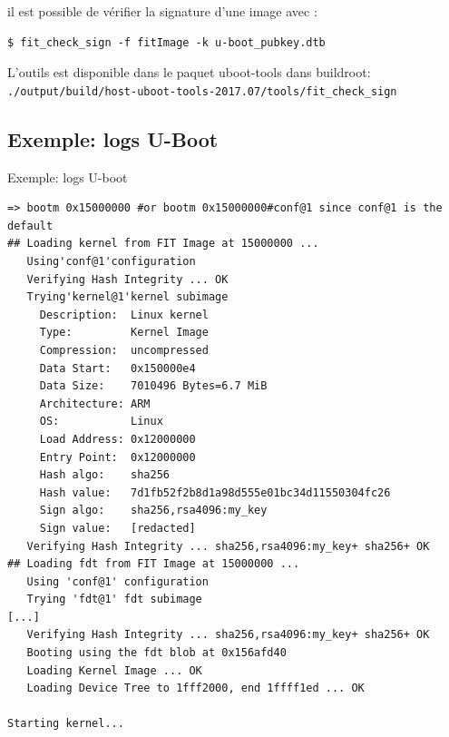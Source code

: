 \documentclass[aspectratio=169]{beamer}
\begin{document}
\begin{frame}[fragile]
il est possible de vérifier la signature d'une image avec :
\begin{lstlisting}[style=shell]
$ fit_check_sign -f fitImage -k u-boot_pubkey.dtb
\end{lstlisting}
L'outils est disponible dans le paquet uboot-tools dans buildroot:\newline
\texttt{./output/build/host-uboot-tools-2017.07/tools/fit\_check\_sign}
\end{frame}


\subsection{Exemple: logs U-Boot}

\begin{frame}
\begin{center}
\large{Exemple: logs U-boot}
\end{center}
\end{frame}

\begin{frame}[fragile]
\begin{lstlisting}[style=shell,basicstyle=\tiny\ttfamily\color{white}]
=> bootm 0x15000000 #or bootm 0x15000000#conf@1 since conf@1 is the default
## Loading kernel from FIT Image at 15000000 ...
   Using'conf@1'configuration
   Verifying Hash Integrity ... OK
   Trying'kernel@1'kernel subimage
     Description:  Linux kernel
     Type:         Kernel Image
     Compression:  uncompressed
     Data Start:   0x150000e4
     Data Size:    7010496 Bytes=6.7 MiB
     Architecture: ARM
     OS:           Linux
     Load Address: 0x12000000
     Entry Point:  0x12000000
     Hash algo:    sha256
     Hash value:   7d1fb52f2b8d1a98d555e01bc34d11550304fc26
     Sign algo:    sha256,rsa4096:my_key
     Sign value:   [redacted]
   Verifying Hash Integrity ... sha256,rsa4096:my_key+ sha256+ OK
## Loading fdt from FIT Image at 15000000 ...
   Using 'conf@1' configuration
   Trying 'fdt@1' fdt subimage
[...]
   Verifying Hash Integrity ... sha256,rsa4096:my_key+ sha256+ OK
   Booting using the fdt blob at 0x156afd40
   Loading Kernel Image ... OK
   Loading Device Tree to 1fff2000, end 1ffff1ed ... OK

Starting kernel...
\end{lstlisting}
\end{frame}


\end{document}
